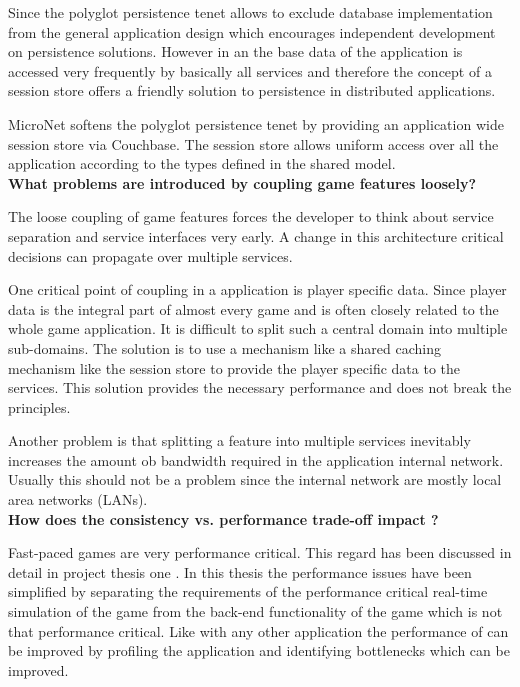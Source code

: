 Since the polyglot persistence tenet allows to exclude database implementation
from the general application design which encourages independent development on
persistence solutions. However in an \og{} the base data of the application is
accessed very frequently by basically all services and therefore the concept of
a session store offers a \ms{} friendly solution to persistence in distributed
applications.

MicroNet softens the polyglot persistence tenet by providing an application wide
session store via Couchbase. The session store allows uniform access over all
the application according to the types defined in the shared model.\\

\noindent
\textbf{What problems are introduced by coupling game features loosely?}

The loose coupling of game features forces the developer to think about service
separation and service interfaces very early. A change in this architecture
critical decisions can propagate over multiple services.

One critical point of coupling in a \og{} application is player specific data.
Since player data is the integral part of almost every game and is often closely
related to the whole game application. It is difficult to split such a central
domain into multiple sub-domains. The solution is to use a mechanism like a
shared caching mechanism like the session store to provide the player specific
data to the services. This solution provides the necessary performance and does
not break the \ms{} principles.

Another problem is that splitting a feature into multiple services inevitably
increases the amount ob bandwidth required in the application internal network.
Usually this should not be a problem since the internal network are mostly
local area networks (LANs).\\

\noindent
\textbf{How does the consistency vs. performance trade-off impact \ogs{}?}

Fast-paced games are very performance critical. This regard has been discussed
in detail in project thesis one . In this
thesis the performance issues have been simplified by separating the
requirements of the performance critical real-time simulation of the game from
the back-end functionality of the game which is not that performance critical.
Like with any other application the performance of \ogs{} can be improved by
profiling the application and identifying bottlenecks which can be improved.

